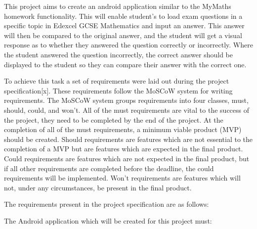 \documentclass{article}
\begin{document}
This project aims to create an android application similar to the MyMaths homework functionality. This will enable student's to load exam questions in a specific topic in Edexcel GCSE Mathematics and input an answer. This answer will then be compared to the original answer, and the student will get a visual response as to whether they answered the question correctly or incorrectly. Where the student answered the question incorrectly, the correct answer should be displayed to the student so they can compare their answer with the correct one. \par

To achieve this task a set of requirements were laid out during the project specification[x]. These requirements follow the MoSCoW system for writing requirements. The MoSCoW system groups requirements into four classes, must, should, could, and won't. All of the must requirements are vital to the success of the project, they need to be completed by the end of the project. At the completion of all of the must requirements, a minimum viable product (MVP) should be created. Should requirements are features which are not essential to the completion of a MVP but are features which are expected in the final product. Could requirements are features which are not expected in the final product, but if all other requirements are completed before the deadline, the could requirements will be implemented. Won't requirements are features which will not, under any circumstances, be present in the final product. \par

The requirements present in the project specification are as follows: \par

The Android application which will be created for this project must: 
\end{document}
